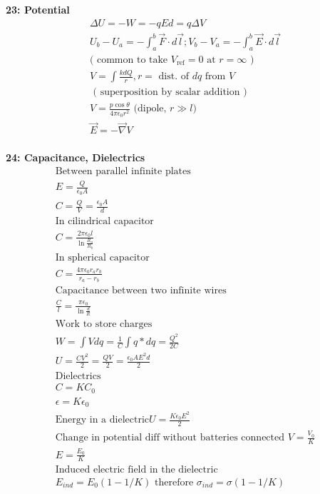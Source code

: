\documentclass[twoside,draft]{article}
\begin{document}
\begin{multicols}{3}
  \textbf{23: Potential}
  \begin{align*}
    \Delta U = -W = -qEd = q\Delta V \\
    U_b - U_a = -\int_a^b \vec{F} \cdot d\vec{l};
    V_b - V_a = -\int_a^b \vec{E} \cdot d\vec{l} \\
    \text{( common to take $V_{\text{ref}} = 0$ at $r = \infty$ )} \\
    V = \int \frac{kdQ}{r}, r = \text{ dist. of $dq$ from $V$ } \\
    \text{ ( superposition by scalar addition ) } \\
    V = \frac{p\cos\theta}{4\pi\epsilon_0r^2} \text{ (dipole, $r \gg l$) } \\
    \vec{E} = -\vec{\nabla} V \\
  \end{align*}

  \textbf{24: Capacitance, Dielectrics}
  \begin{align*}
    \text{Between parallel infinite plates}\\
    E = \frac{Q}{\epsilon_{0} A}\\
    C = \frac{Q}{V} = \frac{\epsilon_{0} A}{d}\\
    \text{In cilindrical capacitor}\\
    C = \frac{2\pi \epsilon_{0} l}{\ln{\frac{R_{a}}{R_{b}}}}\\
    \text{In spherical capacitor}\\
    C = \frac{4\pi \epsilon_{0} r_{a} r_{b}}{r_{a} - r_{b}}\\
    \text{Capacitance between two infinite wires}\\
    \frac{C}{l} = \frac{\pi \epsilon_{0}}{\ln{\frac{d}{R}}}\\
    \text{Work to store charges}\\
    W = \int{V dq} = \frac{1}{C}\int{q*dq} = \frac{Q^2}{2C}\\
    U = \frac{CV^2}{2} = \frac{QV}{2} = \frac{\epsilon_{0}AE^2d}{2}\\
    \text{Dielectrics}\\
    C = KC_{0}\\
    \epsilon = K\epsilon_{0}\\
    \text{Energy in a dielectric} U = \frac{K\epsilon_{0}E^2}{2}\\
    \text{Change in potential diff without batteries connected } V = \frac{V_{0}}{K}\\
    E = \frac{E_{0}}{K}\\
    \text{Induced electric field in the dielectric}\\
    E_{ind} = E_{0}(1-1/K)\text{ therefore } \sigma_{ind} = \sigma(1-1/K)\\
  \end{align*}

\end{multicols}
\end{document}

